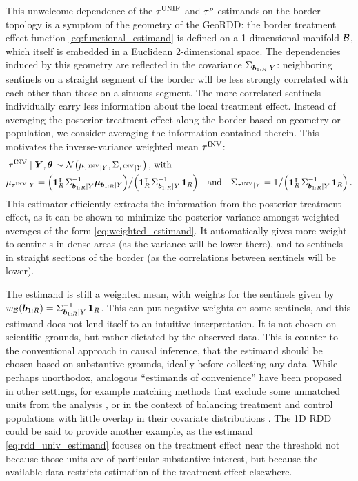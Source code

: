 This unwelcome dependence of the \(\tau^{\mathrm{UNIF}}\) and \(\tau^{\rho}\) estimands on the border topology is a symptom of the geometry of the GeoRDD: the border treatment effect function \autoref{eq:functional_estimand} is defined on a 1-dimensional manifold \(\mathcal{B}\), which itself is embedded in a Euclidean 2-dimensional space.
The dependencies induced by this geometry are reflected in the covariance \(\Sigma_{\bm{b}_{1:R} \mid Y}\): neighboring sentinels on a straight segment of the border will be less strongly correlated with each other than those on a sinuous segment.
The more correlated sentinels individually carry less information about the local treatment effect.
Instead of averaging the posterior treatment effect along the border based on geometry or population, we consider averaging the information contained therein.
This motivates the inverse-variance weighted mean \(\tau^{\mathrm{INV}}\):
\begin{equation}
    \begin{split}
        & \left. \invvar \mid \Yvec, \hyperparam \right. \sim \normal\del{\mu_{\invvar \mid Y}, \Sigma_{\invvar \mid Y}} \,\text{, with} \\
        & \mu_{\invvar \mid Y} = \del{\ones_{\numsent}\trans \Sigma_{\sentinels \mid Y}^{-1} \muvec_{\sentinels \mid Y}} \big/ \del{\ones_{\numsent}\trans \Sigma_{\sentinels \mid Y}^{-1} \ones_{\numsent}} \quad\text{and}\quad
        \Sigma_{\invvar \mid Y} = 1 \big/ \del{\ones_{\numsent}\trans \Sigma_{\sentinels \mid Y}^{-1} \ones_{\numsent}} \,.
    \end{split}
    \label{eq:invvar}
\end{equation}
This estimator efficiently extracts the information from the posterior treatment effect, as it can be shown to minimize the posterior variance amongst weighted averages of the form \autoref{eq:weighted_estimand}.
It automatically gives more weight to sentinels in dense areas (as the variance will be lower there), and to sentinels in straight sections of the border (as the correlations between sentinels will be lower).

The estimand is still a weighted mean, with weights for the sentinels given by \(w_{\mathcal{B}}(\bm{b}_{1:R}) = \Sigma_{\bm{b}_{1:R} \mid Y}^{-1} \operatorname{\mathbf{1}}_{R}\).
This can put negative weights on some sentinels, and this estimand does not lend itself to an intuitive interpretation.
It is not chosen on scientific grounds, but rather dictated by the observed data.
This is counter to the conventional approach in causal inference, that the estimand should be chosen based on substantive grounds, ideally before collecting any data.
While perhaps unorthodox, analogous ``estimands of convenience'' have been proposed in other settings, for example matching methods that exclude some unmatched units from the analysis \citep[discussed in][]{crump2009dealing}, or in the context of balancing treatment and control populations with little overlap in their covariate distributions \citep{li2016balancing}.
The 1D RDD could be said to provide another example, as the estimand \autoref{eq:rdd_univ_estimand} focuses on the treatment effect near the threshold not because those units are of particular substantive interest, but because the available data restricts estimation of the treatment effect elsewhere.

